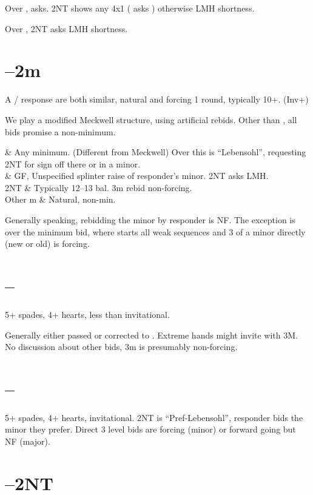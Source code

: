 \documentclass[tom-ari]{subfiles}
\begin{document}
Over ,  asks. 2NT shows any 4x1 ( asks \clubsuit\diamondsuit\heartsuit\spadesuit) otherwise LMH shortness.

Over , 2NT asks LMH shortness.

\section[1D--2m]{--2m}

A / response are both similar, natural and forcing 1 round, typically 10+. (Inv+)

We play a modified Meckwell structure, using artificial rebids. Other than , all bids promise a non-minimum.

\begin{bidtable}{}
	 & Any minimum. (Different from Meckwell) Over this  is ``Lebensohl'', requesting 2NT for sign off there or in a minor. \\
	 & GF, Unspecified splinter raise of responder's minor. 2NT asks LMH. \\
	2NT & Typically 12--13 bal. 3m rebid non-forcing. \\
	Other m &  Natural, non-min.
\end{bidtable}

Generally speaking, rebidding the minor by responder is NF. The exception is over the  minimum bid, where  starts all weak sequences and 3 of a minor directly (new or old) is forcing.

\section[1D--2H]{--}

5+ spades, 4+ hearts, less than invitational. 

Generally either passed or corrected to . Extreme hands might invite with 3M. No discussion about other bids, 3m is presumably non-forcing.

\section[1D--2S]{--}

5+ spades, 4+ hearts, invitational.  2NT is ``Pref-Lebensohl'', responder bids the minor they prefer. Direct 3 level bids are forcing (minor) or forward going but NF (major).

\section[1D--2NT]{--2NT}
\end{document}
